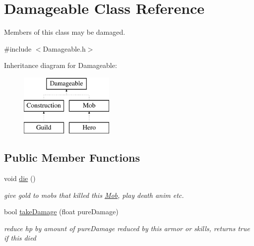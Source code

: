 \hypertarget{class_damageable}{}\section{Damageable Class Reference}
\label{class_damageable}


Members of this class may be damaged.  




{\ttfamily \#include $<$Damageable.\+h$>$}

Inheritance diagram for Damageable\+:\begin{figure}[H]
\begin{center}
\leavevmode
\includegraphics[height=3.000000cm]{class_damageable}
\end{center}
\end{figure}
\subsection*{Public Member Functions}
\begin{DoxyCompactItemize}
\item 
void \hyperlink{class_damageable_a61f6bcf8018bd7b126245f55ef29cd14}{die} ()\hypertarget{class_damageable_a61f6bcf8018bd7b126245f55ef29cd14}{}\label{class_damageable_a61f6bcf8018bd7b126245f55ef29cd14}

\begin{DoxyCompactList}\small\item\em give gold to mobs that killed this \hyperlink{class_mob}{Mob}, play death anim etc. \end{DoxyCompactList}\item 
bool \hyperlink{class_damageable_aa12cca043f17d936f5567fd08cd073af}{take\+Damage} (float pure\+Damage)\hypertarget{class_damageable_aa12cca043f17d936f5567fd08cd073af}{}\label{class_damageable_aa12cca043f17d936f5567fd08cd073af}

\begin{DoxyCompactList}\small\item\em reduce hp by amount of pure\+Damage reduced by this armor or skills, returns true if this died \end{DoxyCompactList}\end{DoxyCompactItemize}
